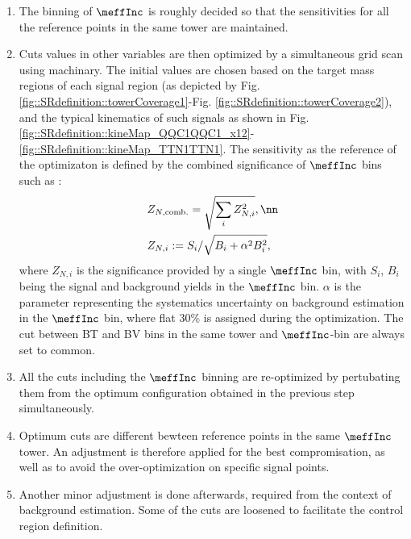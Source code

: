 \begin{enumerate}
\item The binning of $\meffInc$ is roughly decided so that the sensitivities for all the reference points in the same tower are maintained.
\item Cuts values in other variables are then optimized by a simultaneous grid scan using machinary. The initial values are chosen based on the target mass regions of each signal region (as depicted by Fig. \ref{fig::SRdefinition::towerCoverage1}-Fig. \ref{fig::SRdefinition::towerCoverage2}), and the typical kinematics of such signals as shown in Fig. \ref{fig::SRdefinition::kineMap_QQC1QQC1_x12}-\ref{fig::SRdefinition::kineMap_TTN1TTN1}.
The sensitivity as the reference of the optimizaton is defined by the combined significance of $\meffInc$ bins such as :
\begin{align}
& Z_{N,\mathrm{comb.}} =\sqrt{\sum_i Z_{N,i}^2}, \nn \\
& Z_{N,i} := S_i/\sqrt{B_i+\alpha^2 B_i^2}, \label{ZNcomb}
\end{align}
where $Z_{N,i}$ is the significance provided by a single $\meffInc$ bin, with $S_i$, $B_i$ being the signal and background yields in the $\meffInc$ bin. $\alpha$ is the parameter representing the systematics uncertainty on background estimation in the $\meffInc$ bin, where flat $30\%$ is assigned during the optimization. The cut between BT and BV bins in the same tower and $\meffInc$-bin are always set to common.

\item All the cuts including the $\meffInc$ binning are re-optimized by pertubating them from the optimum configuration obtained in the previous step simultaneously.

\item Optimum cuts are different bewteen reference points in the same $\meffInc$ tower. An adjustment is therefore applied for the best compromisation, as well as to avoid the over-optimization on specific signal points.

\item Another minor adjustment is done afterwards, required from the context of background estimation. Some of the cuts are loosened to facilitate the control region definition.
\end{enumerate}

